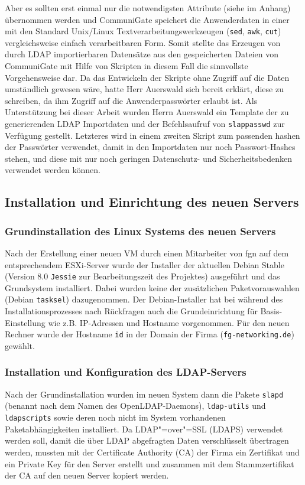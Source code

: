 \documentclass[11pt,a4paper,titlepage=firstiscover,headsepline,bibtotoc]{scrartcl} %
\begin{document}
Aber es sollten erst einmal nur die notwendigsten Attribute (siehe  im Anhang) übernommen werden und CommuniGate speichert die Anwenderdaten in einer mit den Standard Unix/Linux Textverarbeitungswerkzeugen (\texttt{sed}, \texttt{awk}, \texttt{cut}) vergleichsweise einfach verarbeitbaren Form. Somit stellte das Erzeugen von durch LDAP importierbaren Datensätze aus den gespeicherten Dateien von CommuniGate mit Hilfe von Skripten in diesem Fall die sinnvollste Vorgehensweise dar. Da das Entwickeln der Skripte ohne Zugriff auf die Daten umständlich gewesen wäre, hatte Herr Auerswald sich bereit erklärt, diese zu schreiben, da ihm Zugriff auf die Anwenderpasswörter erlaubt ist. Als Unterstützung bei dieser Arbeit wurden Herrn Auerswald ein Template der zu generierenden LDAP Importdaten und der Befehlsaufruf von \texttt{slappasswd} zur Verfügung gestellt. Letzteres wird in einem zweiten Skript zum passenden hashen der Passwörter verwendet, damit in den Importdaten nur noch Passwort-Hashes stehen, und diese mit nur noch geringen Datenschutz- und Sicherheitsbedenken verwendet werden können.

\subsection{Installation und Einrichtung des neuen Servers}
\subsubsection{Grundinstallation des Linux Systems des neuen Servers}
Nach der Erstellung einer neuen VM durch einen Mitarbeiter von fgn auf dem entsprechendem ESXi-Server wurde der Installer der aktuellen Debian Stable (Version 8.0 \texttt{Jessie} zur Bearbeitungszeit des Projektes) ausgeführt und das Grundsystem installiert. Dabei wurden keine der zusätzlichen Paketvorauswahlen (Debian \texttt{tasksel}) dazugenommen.  Der Debian-Installer hat bei während des Installationsprozesses nach Rückfragen auch die Grundeinrichtung für Basis-Einstellung wie z.B. IP-Adressen und Hostname vorgenommen. Für den neuen Rechner wurde der Hostname \texttt{id} in der Domain der Firma (\texttt{fg-networking.de}) gewählt.

\subsubsection{Installation und Konfiguration des LDAP-Servers}
Nach der Grundinstallation wurden im neuen System dann die Pakete \texttt{slapd} (benannt nach dem Namen des OpenLDAP-Daemons), \texttt{ldap-utils} und \texttt{ldapscripts} sowie deren noch nicht im System vorhandenen Paketabhängigkeiten installiert. Da LDAP"=over"=SSL (LDAPS) verwendet werden soll, damit die über LDAP abgefragten Daten verschlüsselt übertragen werden, mussten mit der Certificate Authority (CA) der Firma ein Zertifikat und ein Private Key für den Server erstellt und zusammen mit dem Stammzertifikat der CA auf den neuen Server kopiert werden.
\end{document}
